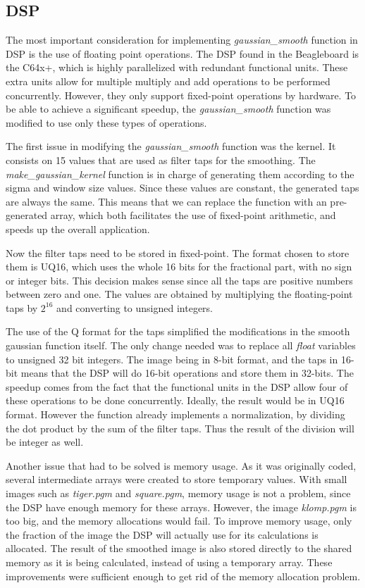 \subsection{DSP}
The most important consideration for implementing \textit{gaussian\_smooth} function in DSP is the use of floating point operations. The DSP found in the Beagleboard is the C64x+, which is highly parallelized with redundant functional units. These extra units allow for multiple multiply and add operations to be performed concurrently. However, they only support fixed-point operations by hardware. To be able to achieve a significant speedup, the \textit{gaussian\_smooth} function was modified to use only these types of operations.

The first issue in modifying the \textit{gaussian\_smooth} function was the kernel. It consists on 15 values that are used as filter taps for the smoothing. The \textit{make\_gaussian\_kernel} function is in charge of generating them according to the sigma and window size values. Since these values are constant, the generated taps are always the same. This means that we can replace the function with an pre-generated array, which both facilitates the use of fixed-point arithmetic, and speeds up the overall application.

Now the filter taps need to be stored in fixed-point. The format chosen to store them is UQ16, which uses the whole 16 bits for the fractional part, with no sign or integer bits. This decision makes sense since all the taps are positive numbers between zero and one. The values are obtained by multiplying the floating-point taps by $2^{16}$ and converting to unsigned integers.

The use of the Q format for the taps simplified the modifications in the smooth gaussian function itself. The only change needed was to replace all \textit{float} variables to unsigned 32 bit integers. The image being in 8-bit format, and the taps in 16-bit means that the DSP will do 16-bit operations and store them in 32-bits.  The speedup comes from the fact that the functional units in the DSP allow four of these operations to be done concurrently. Ideally, the result would be in UQ16 format. However the function already implements a normalization, by dividing the dot product by the sum of the filter taps. Thus the result of the division will be integer as well.

Another issue that had to be solved is memory usage. As it was originally coded, several intermediate arrays were created to store temporary values. With small images such as \textit{tiger.pgm} and \textit{square.pgm}, memory usage is not a problem, since the DSP have enough memory for these arrays. However, the image \textit{klomp.pgm} is too big, and the memory allocations would fail. To improve memory usage, only the fraction of the image the DSP will actually use for its calculations is allocated. The result of the smoothed image is also stored directly to the shared memory as it is being calculated, instead of using a temporary array. These improvements were sufficient enough to get rid of the memory allocation problem.